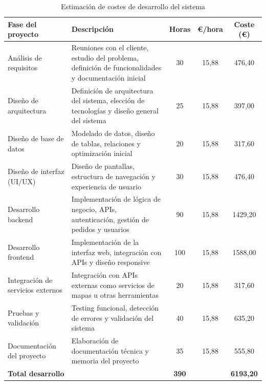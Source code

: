 \begin{table}[H]
\centering
\caption{Estimación de costes de desarrollo del sistema}
\label{tabla_coste_desarrollo}
\begin{tabular}{|p{3cm}|p{6cm}|c|c|c|}
\hline
\textbf{Fase del proyecto} & \textbf{Descripción} & \textbf{Horas} & \textbf{€/hora} & \textbf{Coste (€)} \\ \hline

Análisis de requisitos &
Reuniones con el cliente, estudio del problema, definición de funcionalidades y documentación inicial &
30 & 15,88 & 476,40 \\ \hline

Diseño de arquitectura &
Definición de arquitectura del sistema, elección de tecnologías y diseño general del sistema &
25 & 15,88 & 397,00 \\ \hline

Diseño de base de datos &
Modelado de datos, diseño de tablas, relaciones y optimización inicial &
20 & 15,88 & 317,60 \\ \hline

Diseño de interfaz (UI/UX) &
Diseño de pantallas, estructura de navegación y experiencia de usuario &
30 & 15,88 & 476,40 \\ \hline

Desarrollo backend &
Implementación de lógica de negocio, APIs, autenticación, gestión de pedidos y usuarios &
90 & 15,88 & 1429,20 \\ \hline

Desarrollo frontend &
Implementación de la interfaz web, integración con APIs y diseño responsive &
100 & 15,88 & 1588,00 \\ \hline

Integración de servicios externos &
Integración con APIs externas como servicios de mapas u otras herramientas &
20 & 15,88 & 317,60 \\ \hline

Pruebas y validación &
Testing funcional, detección de errores y validación del sistema &
40 & 15,88 & 635,20 \\ \hline

Documentación del proyecto &
Elaboración de documentación técnica y memoria del proyecto &
35 & 15,88 & 555,80 \\ \hline

\textbf{Total desarrollo} & & \textbf{390} & & \textbf{6193,20} \\ \hline

\end{tabular}
\end{table}

